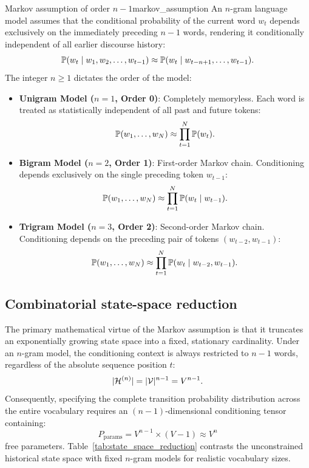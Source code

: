 \documentclass[../../main.tex]{subfiles}
\begin{document}
\begin{definition}{Markov assumption of order $n-1$}{markov_assumption}
An $n$-gram language model assumes that the conditional probability of the current word $w_t$ depends exclusively on the immediately preceding $n-1$ words, rendering it conditionally independent of all earlier discourse history:
\begin{equation}
\label{eq:markov_approx}
\mathbb{P}(w_t \mid w_1, w_2, \dots, w_{t-1}) \approx \mathbb{P}(w_t \mid w_{t-n+1}, \dots, w_{t-1}).
\end{equation}
The integer $n \ge 1$ dictates the order of the model:
\begin{itemize}
    \item \textbf{Unigram Model ($n=1$, Order 0)}: Completely memoryless. Each word is treated as statistically independent of all past and future tokens:
    \[
    \mathbb{P}(w_1, \dots, w_N) \approx \prod_{t=1}^N \mathbb{P}(w_t).
    \]
    \item \textbf{Bigram Model ($n=2$, Order 1)}: First-order Markov chain. Conditioning depends exclusively on the single preceding token $w_{t-1}$:
    \[
    \mathbb{P}(w_1, \dots, w_N) \approx \prod_{t=1}^N \mathbb{P}(w_t \mid w_{t-1}).
    \]
    \item \textbf{Trigram Model ($n=3$, Order 2)}: Second-order Markov chain. Conditioning depends on the preceding pair of tokens $(w_{t-2}, w_{t-1})$:
    \[
    \mathbb{P}(w_1, \dots, w_N) \approx \prod_{t=1}^N \mathbb{P}(w_t \mid w_{t-2}, w_{t-1}).
    \]
\end{itemize}
\end{definition}

\subsection{Combinatorial state-space reduction}
The primary mathematical virtue of the Markov assumption is that it truncates an exponentially growing state space into a fixed, stationary cardinality. Under an $n$-gram model, the conditioning context is always restricted to $n-1$ words, regardless of the absolute sequence position $t$:
\begin{equation}
\label{eq:state_space_markov}
|\mathcal{H}^{(n)}| = |\mathcal{V}|^{n-1} = V^{n-1}.
\end{equation}
Consequently, specifying the complete transition probability distribution across the entire vocabulary requires an $(n-1)$-dimensional conditioning tensor containing:
\begin{equation}
\label{eq:parameters_ngram}
P_{\text{params}} = V^{n-1} \times (V - 1) \approx V^n
\end{equation}
free parameters. Table~\ref{tab:state_space_reduction} contrasts the unconstrained historical state space with fixed $n$-gram models for realistic vocabulary sizes.
\end{document}

